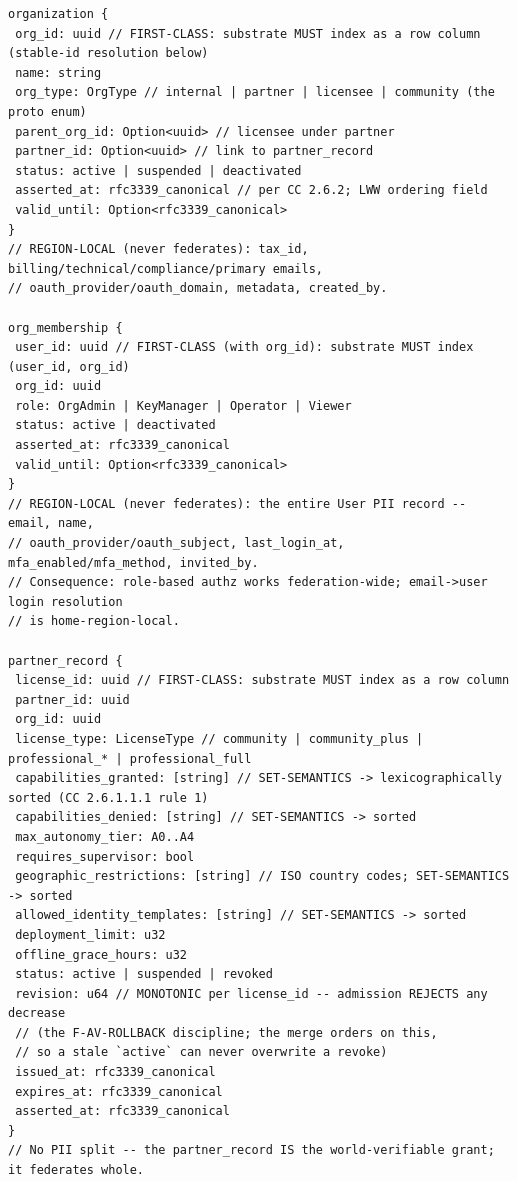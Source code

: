 \documentclass[11pt]{article}
\begin{document}
\begin{lstlisting}
organization {
 org_id: uuid // FIRST-CLASS: substrate MUST index as a row column (stable-id resolution below)
 name: string
 org_type: OrgType // internal | partner | licensee | community (the proto enum)
 parent_org_id: Option<uuid> // licensee under partner
 partner_id: Option<uuid> // link to partner_record
 status: active | suspended | deactivated
 asserted_at: rfc3339_canonical // per CC 2.6.2; LWW ordering field
 valid_until: Option<rfc3339_canonical>
}
// REGION-LOCAL (never federates): tax_id, billing/technical/compliance/primary emails,
// oauth_provider/oauth_domain, metadata, created_by.

org_membership {
 user_id: uuid // FIRST-CLASS (with org_id): substrate MUST index (user_id, org_id)
 org_id: uuid
 role: OrgAdmin | KeyManager | Operator | Viewer
 status: active | deactivated
 asserted_at: rfc3339_canonical
 valid_until: Option<rfc3339_canonical>
}
// REGION-LOCAL (never federates): the entire User PII record -- email, name,
// oauth_provider/oauth_subject, last_login_at, mfa_enabled/mfa_method, invited_by.
// Consequence: role-based authz works federation-wide; email->user login resolution
// is home-region-local.

partner_record {
 license_id: uuid // FIRST-CLASS: substrate MUST index as a row column
 partner_id: uuid
 org_id: uuid
 license_type: LicenseType // community | community_plus | professional_* | professional_full
 capabilities_granted: [string] // SET-SEMANTICS -> lexicographically sorted (CC 2.6.1.1.1 rule 1)
 capabilities_denied: [string] // SET-SEMANTICS -> sorted
 max_autonomy_tier: A0..A4
 requires_supervisor: bool
 geographic_restrictions: [string] // ISO country codes; SET-SEMANTICS -> sorted
 allowed_identity_templates: [string] // SET-SEMANTICS -> sorted
 deployment_limit: u32
 offline_grace_hours: u32
 status: active | suspended | revoked
 revision: u64 // MONOTONIC per license_id -- admission REJECTS any decrease
 // (the F-AV-ROLLBACK discipline; the merge orders on this,
 // so a stale `active` can never overwrite a revoke)
 issued_at: rfc3339_canonical
 expires_at: rfc3339_canonical
 asserted_at: rfc3339_canonical
}
// No PII split -- the partner_record IS the world-verifiable grant; it federates whole.
\end{lstlisting}
\end{document}
